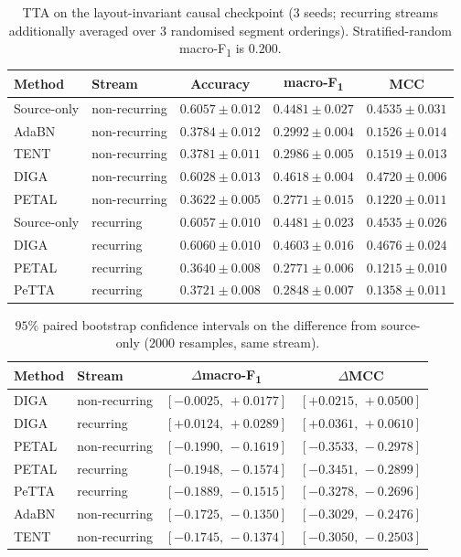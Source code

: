 \documentclass[a4paper,fleqn]{cas-dc}
\newcommand{\macf}{macro-F\textsubscript{1}}
\begin{document}
\begin{table}[t]
\centering
\caption{TTA on the layout-invariant causal checkpoint (3 seeds; recurring streams
additionally averaged over 3 randomised segment orderings). Stratified-random \macf{} is
$0.200$.}
\label{tab:tta}
\small
\begin{tabular}{llccc}
\toprule
Method & Stream & Accuracy & \macf & MCC \\
\midrule
Source-only & non-recurring & $0.6057\pm0.012$ & $0.4481\pm0.027$ & $0.4535\pm0.031$ \\
AdaBN       & non-recurring & $0.3784\pm0.012$ & $0.2992\pm0.004$ & $0.1526\pm0.014$ \\
TENT        & non-recurring & $0.3781\pm0.011$ & $0.2986\pm0.005$ & $0.1519\pm0.013$ \\
DIGA        & non-recurring & $0.6028\pm0.013$ & $\mathbf{0.4618}\pm0.004$ & $\mathbf{0.4720}\pm0.006$ \\
PETAL       & non-recurring & $0.3622\pm0.005$ & $0.2771\pm0.015$ & $0.1220\pm0.011$ \\
\midrule
Source-only & recurring & $0.6057\pm0.010$ & $0.4481\pm0.023$ & $0.4535\pm0.026$ \\
DIGA        & recurring & $\mathbf{0.6060}\pm0.010$ & $0.4603\pm0.016$ & $0.4676\pm0.024$ \\
PETAL       & recurring & $0.3640\pm0.008$ & $0.2771\pm0.006$ & $0.1215\pm0.010$ \\
PeTTA       & recurring & $0.3721\pm0.008$ & $0.2848\pm0.007$ & $0.1358\pm0.011$ \\
\bottomrule
\end{tabular}
\end{table}

\begin{table}[t]
\centering
\caption{$95\%$ paired bootstrap confidence intervals on the difference from source-only
($2000$ resamples, same stream).}
\label{tab:boot}
\small
\begin{tabular}{llcc}
\toprule
Method & Stream & $\Delta$\macf & $\Delta$MCC \\
\midrule
DIGA  & non-recurring & $[-0.0025,\,+0.0177]$ & $[+0.0215,\,+0.0500]$ \\
DIGA  & recurring     & $[+0.0124,\,+0.0289]$ & $[+0.0361,\,+0.0610]$ \\
PETAL & non-recurring & $[-0.1990,\,-0.1619]$ & $[-0.3533,\,-0.2978]$ \\
PETAL & recurring     & $[-0.1948,\,-0.1574]$ & $[-0.3451,\,-0.2899]$ \\
PeTTA & recurring     & $[-0.1889,\,-0.1515]$ & $[-0.3278,\,-0.2696]$ \\
AdaBN & non-recurring & $[-0.1725,\,-0.1350]$ & $[-0.3029,\,-0.2476]$ \\
TENT  & non-recurring & $[-0.1745,\,-0.1374]$ & $[-0.3050,\,-0.2503]$ \\
\bottomrule
\end{tabular}
\end{table}
\end{document}
